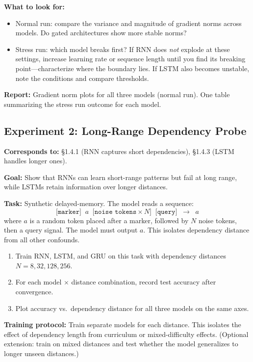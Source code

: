 \textbf{What to look for:}
\begin{itemize}[nosep]
    \item Normal run: compare the variance and magnitude of gradient norms across models. Do gated architectures show more stable norms?
    \item Stress run: which model breaks first? If RNN does \emph{not} explode at these settings, increase learning rate or sequence length until you find its breaking point---characterize where the boundary lies. If LSTM also becomes unstable, note the conditions and compare thresholds.
\end{itemize}

\textbf{Report:} Gradient norm plots for all three models (normal run). One table summarizing the stress run outcome for each model.

\subsection*{Experiment 2: Long-Range Dependency Probe}

\textbf{Corresponds to:} \S1.4.1 (RNN captures short dependencies), \S1.4.3 (LSTM handles longer ones).

\textbf{Goal:} Show that RNNs can learn short-range patterns but fail at long range, while LSTMs retain information over longer distances.

\textbf{Task:} Synthetic delayed-memory. The model reads a sequence:
\[
\texttt{[marker]} \;\; a \;\; \texttt{[noise tokens} \times N\texttt{]} \;\; \texttt{[query]} \;\; \rightarrow \;\; a
\]
where $a$ is a random token placed after a marker, followed by $N$ noise tokens, then a query signal. The model must output $a$. This isolates dependency distance from all other confounds.

\begin{enumerate}[nosep]
    \item Train RNN, LSTM, and GRU on this task with dependency distances $N = 8, 32, 128, 256$.
    \item For each model $\times$ distance combination, record test accuracy after convergence.
    \item Plot accuracy vs.\ dependency distance for all three models on the same axes.
\end{enumerate}

\textbf{Training protocol:} Train separate models for each distance. This isolates the effect of dependency length from curriculum or mixed-difficulty effects. (Optional extension: train on mixed distances and test whether the model generalizes to longer unseen distances.)

